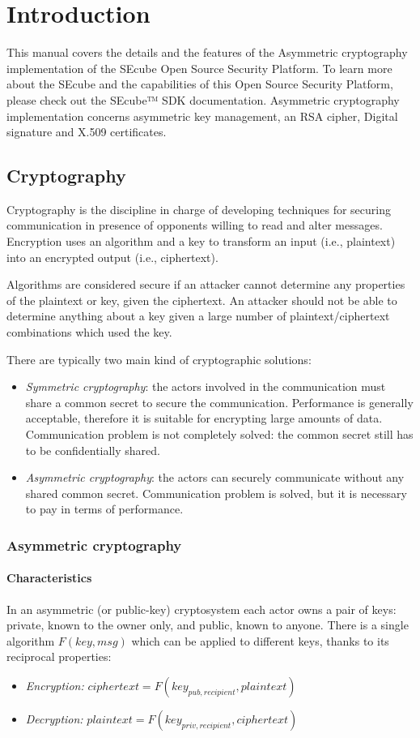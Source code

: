 \chapter{Introduction}
This manual covers the details and the features of the Asymmetric cryptography
implementation of the SEcube\textsuperscript{\texttrademark} Open Source
Security Platform. To learn more about the
SEcube\textsuperscript{\texttrademark} and the capabilities of this Open Source
Security Platform, please check out the SEcube™ SDK documentation.  Asymmetric
cryptography implementation concerns asymmetric key management, an RSA cipher,
Digital signature and X.509 certificates.

\section{Cryptography}
Cryptography is the discipline in charge of developing techniques for securing
communication in presence of opponents willing to read and alter messages.
Encryption uses an algorithm and a key to transform an input (i.e., plaintext)
into an encrypted output (i.e., ciphertext).

Algorithms are considered secure if an attacker cannot determine any properties
of the plaintext or key, given the ciphertext. An attacker should not be able
to determine anything about a key given a large number of plaintext/ciphertext
combinations which used the key.

There are typically two main kind of cryptographic solutions:
\begin{itemize}
	\item \emph{Symmetric cryptography}: the actors involved in the
		communication must share a common secret to secure the
		communication. Performance is generally acceptable, therefore
		it is suitable for encrypting large amounts of data.
		Communication problem is not completely solved: the common
		secret still has to be confidentially shared.
	\item \emph{Asymmetric cryptography}: the actors can securely
		communicate without any shared common secret.
		Communication problem is solved, but it is necessary to pay in
		terms of performance.
\end{itemize}

\subsection{Asymmetric cryptography}
\subsubsection{Characteristics}
In an asymmetric (or public-key) cryptosystem each actor owns a pair of keys:
private, known to the owner only, and public, known to anyone.
There is a single algorithm $F(key, msg)$ which can be applied to different
keys, thanks to its reciprocal properties:
\begin{itemize}
	\item \emph{Encryption:} $ciphertext = F(key_{pub, recipient}, plaintext)$
	\item \emph{Decryption:} $plaintext = F(key_{priv, recipient}, ciphertext)$
\end{itemize}

